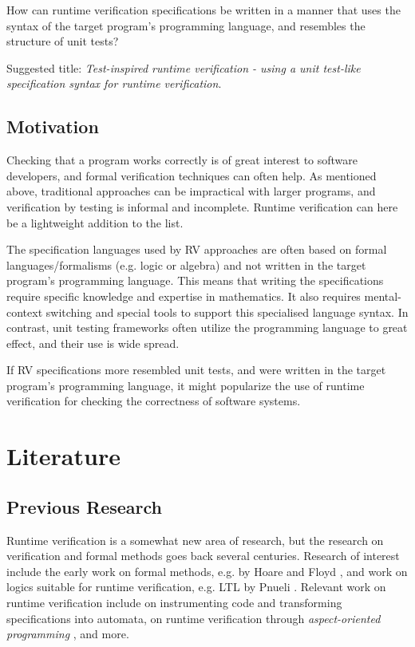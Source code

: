 \documentclass[a4paper,11pt]{article}
\begin{document}
How can runtime verification specifications be written in a manner that uses the syntax of
the target program's programming language, and resembles the structure of unit tests?

Suggested title: \textit{Test-inspired runtime verification - using a unit test-like specification syntax for runtime verification}.


\subsection{Motivation}

Checking that a program works correctly is of great interest to software developers, and
formal verification techniques can often help. As mentioned above, traditional approaches
can be impractical with larger programs, and verification by testing is
informal and incomplete.
Runtime verification can here be a lightweight addition to the list.

The specification languages used by RV approaches are often based
on formal languages/formalisms (e.g. logic or algebra) and not written in the target program's programming language. 
This means that writing the specifications require specific knowledge and expertise in mathematics. 
It also requires mental-context switching and special tools
to support this specialised language syntax. In contrast, unit testing frameworks often
utilize the programming language to great effect, and their use is wide spread.

If RV specifications more resembled unit tests, and were written in the target program's
programming language, it might popularize the use of runtime verification for
checking the correctness of software systems.


\section{Literature}

\subsection{Previous Research}

Runtime verification is a somewhat new area of research, but the research on verification and formal methods goes back several centuries. Research of interest include the early work on formal methods, e.g. by Hoare \cite{hoare69} and Floyd \cite{floyd67}, and work on logics suitable for runtime verification, e.g. LTL by Pnueli \cite{pnueli77}. Relevant work on runtime verification include \cite{bauer06} on instrumenting code and transforming specifications into automata, \cite{bodden05} on runtime verification through \emph{aspect-oriented programming} \cite{aspectj}, and more. 
\end{document}
